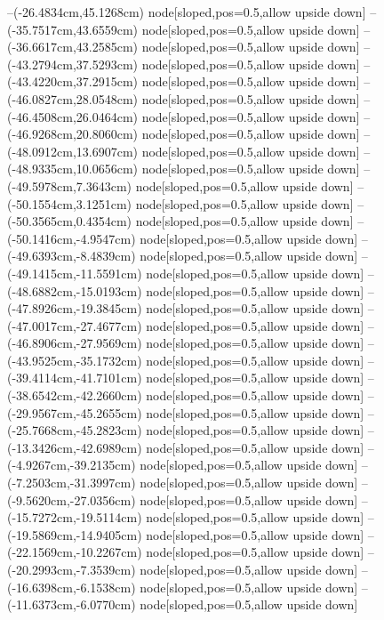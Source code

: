 --(-26.4834cm,45.1268cm) node[sloped,pos=0.5,allow upside down]{\ArrowIn}
--(-35.7517cm,43.6559cm) node[sloped,pos=0.5,allow upside down]{\ArrowIn}
--(-36.6617cm,43.2585cm) node[sloped,pos=0.5,allow upside down]{\arrowIn}
--(-43.2794cm,37.5293cm) node[sloped,pos=0.5,allow upside down]{\ArrowIn}
--(-43.4220cm,37.2915cm) node[sloped,pos=0.5,allow upside down]{\arrowIn}
--(-46.0827cm,28.0548cm) node[sloped,pos=0.5,allow upside down]{\ArrowIn}
--(-46.4508cm,26.0464cm) node[sloped,pos=0.5,allow upside down]{\ArrowIn}
--(-46.9268cm,20.8060cm) node[sloped,pos=0.5,allow upside down]{\ArrowIn}
--(-48.0912cm,13.6907cm) node[sloped,pos=0.5,allow upside down]{\ArrowIn}
--(-48.9335cm,10.0656cm) node[sloped,pos=0.5,allow upside down]{\ArrowIn}
--(-49.5978cm,7.3643cm) node[sloped,pos=0.5,allow upside down]{\ArrowIn}
--(-50.1554cm,3.1251cm) node[sloped,pos=0.5,allow upside down]{\ArrowIn}
--(-50.3565cm,0.4354cm) node[sloped,pos=0.5,allow upside down]{\ArrowIn}
--(-50.1416cm,-4.9547cm) node[sloped,pos=0.5,allow upside down]{\ArrowIn}
--(-49.6393cm,-8.4839cm) node[sloped,pos=0.5,allow upside down]{\ArrowIn}
--(-49.1415cm,-11.5591cm) node[sloped,pos=0.5,allow upside down]{\ArrowIn}
--(-48.6882cm,-15.0193cm) node[sloped,pos=0.5,allow upside down]{\ArrowIn}
--(-47.8926cm,-19.3845cm) node[sloped,pos=0.5,allow upside down]{\ArrowIn}
--(-47.0017cm,-27.4677cm) node[sloped,pos=0.5,allow upside down]{\ArrowIn}
--(-46.8906cm,-27.9569cm) node[sloped,pos=0.5,allow upside down]{\arrowIn}
--(-43.9525cm,-35.1732cm) node[sloped,pos=0.5,allow upside down]{\ArrowIn}
--(-39.4114cm,-41.7101cm) node[sloped,pos=0.5,allow upside down]{\ArrowIn}
--(-38.6542cm,-42.2660cm) node[sloped,pos=0.5,allow upside down]{\arrowIn}
--(-29.9567cm,-45.2655cm) node[sloped,pos=0.5,allow upside down]{\ArrowIn}
--(-25.7668cm,-45.2823cm) node[sloped,pos=0.5,allow upside down]{\ArrowIn}
--(-13.3426cm,-42.6989cm) node[sloped,pos=0.5,allow upside down]{\ArrowIn}
--(-4.9267cm,-39.2135cm) node[sloped,pos=0.5,allow upside down]{\ArrowIn}
--(-7.2503cm,-31.3997cm) node[sloped,pos=0.5,allow upside down]{\ArrowIn}
--(-9.5620cm,-27.0356cm) node[sloped,pos=0.5,allow upside down]{\ArrowIn}
--(-15.7272cm,-19.5114cm) node[sloped,pos=0.5,allow upside down]{\ArrowIn}
--(-19.5869cm,-14.9405cm) node[sloped,pos=0.5,allow upside down]{\ArrowIn}
--(-22.1569cm,-10.2267cm) node[sloped,pos=0.5,allow upside down]{\ArrowIn}
--(-20.2993cm,-7.3539cm) node[sloped,pos=0.5,allow upside down]{\ArrowIn}
--(-16.6398cm,-6.1538cm) node[sloped,pos=0.5,allow upside down]{\ArrowIn}
--(-11.6373cm,-6.0770cm) node[sloped,pos=0.5,allow upside down]{\ArrowIn}
